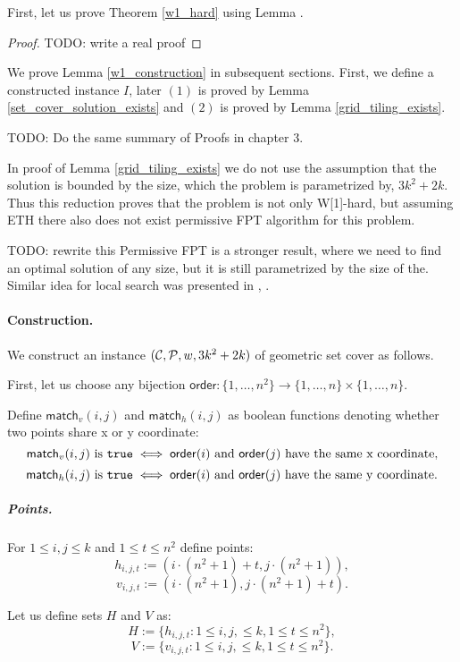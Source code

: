First, let us prove Theorem \ref{w1_hard} using Lemma \cite{w1_construction}.

\begin{proof}
TODO: write a real proof
\end{proof}

We prove Lemma \ref{w1_construction} in subsequent sections.
First, we define a constructed instance $I$, later
$(1)$ is proved by Lemma \ref{set_cover_solution_exists}
and $(2)$ is proved by Lemma \ref{grid_tiling_exists}.

TODO: Do the same summary of Proofs in chapter 3.


In proof of Lemma \ref{grid_tiling_exists}
we do not use the assumption that
the solution is bounded by the size,
which the problem is parametrized by, $3k^2+2k$.
Thus this reduction
proves that the problem is not only W[1]-hard, but assuming ETH 
there also does not exist permissive FPT algorithm for this problem.

TODO: rewrite this
Permissive FPT is a stronger result, where 
we need to find an optimal solution
of any size, but it is still parametrized
by the size of the.
Similar idea for local search was presented in \cite{permissive_problem1}, \cite{permissive_problem2}.

\paragraph{Construction.}
\newcommand{\order}{\mathsf{order}}
\newcommand{\matchv}{\mathsf{match}_v}
\newcommand{\matchh}{\mathsf{match}_h}

We construct an instance $(\mathcal{C}, \mathcal{P}, w, 3k^2+2k)$ of geometric set cover as follows.

First, let us choose any bijection
$\order : \{1, \ldots, n^2\} \rightarrow \{1, \ldots, n\} \times \{1, \ldots, n\}$.


Define $\matchv(i, j)$ and $\matchh(i, j)$
as boolean functions denoting whether two points share x or y coordinate:
$$\matchv(i, j) \text{ is } \true \iff
\order(i) \text{ and } \order(j) \text{ have the same x coordinate,}$$
$$\matchh(i, j) \text{ is } \true \iff
\order(i) \text{ and } \order(j) \text{ have the same y coordinate.}$$


\subparagraph{Points.}

For $1 \le i,j \le k$ and $1 \le t \le n^2$ define points:
	$$h_{i, j, t} := (i \cdot (n^2+1) + t, j \cdot (n^2+1)),$$
	$$v_{i, j, t} := (i \cdot (n^2+1), j \cdot (n^2+1) + t).$$
	
Let us define sets $H$ and $V$ as:
$$H := \{h_{i, j, t} : 1 \le i, j, \le k, 1 \le t \le n^2\},$$
$$V := \{v_{i, j, t} : 1 \le i, j, \le k, 1 \le t \le n^2\}.$$
	
